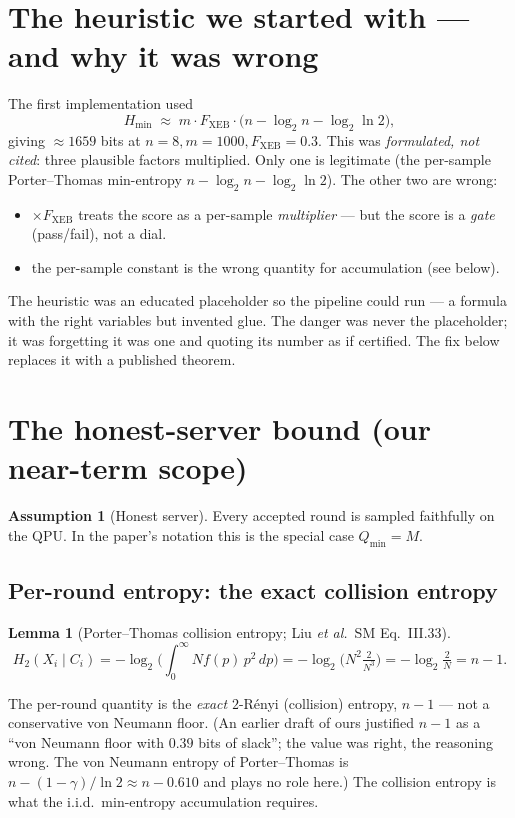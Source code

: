 \documentclass[11pt]{article}
\theoremstyle{definition}
\newtheorem{assumption}{Assumption}
\theoremstyle{plain}
\newtheorem{lemma}{Lemma}
\newcommand{\Fxeb}{F_{\mathrm{XEB}}}
\newcommand{\Hmin}{H_{\min}}
\newcommand{\Qmin}{Q_{\min}}
\begin{document}
\section{The heuristic we started with --- and why it was wrong}
The first implementation used
\[
\Hmin \;\approx\; m\cdot\Fxeb\cdot\big(n-\log_2 n-\log_2\ln 2\big),
\]
giving $\approx1659$ bits at $n=8,m=1000,\Fxeb=0.3$. This was \emph{formulated, not cited}:
three plausible factors multiplied. Only one is legitimate (the per-sample Porter--Thomas
min-entropy $n-\log_2 n-\log_2\ln2$). The other two are wrong:
\begin{itemize}[leftmargin=1.6em,itemsep=1pt]
\item $\times\Fxeb$ treats the score as a per-sample \emph{multiplier} --- but the score is
a \emph{gate} (pass/fail), not a dial.
\item the per-sample constant is the wrong quantity for accumulation (see below).
\end{itemize}

\begin{plain}
The heuristic was an educated placeholder so the pipeline could run --- a formula with the
right variables but invented glue. The danger was never the placeholder; it was forgetting
it was one and quoting its number as if certified. The fix below replaces it with a
published theorem.
\end{plain}

\section{The honest-server bound (our near-term scope)}
\begin{assumption}[Honest server]\label{ass:hs}
Every accepted round is sampled faithfully on the QPU. In the paper's notation this is the
special case $\Qmin=M$.
\end{assumption}

\subsection{Per-round entropy: the exact collision entropy}
\begin{lemma}[Porter--Thomas collision entropy; Liu \emph{et al.}\ SM Eq.~III.33]\label{lem:h2}
\[
H_2(X_i\mid C_i) = -\log_2\!\Big(\int_0^\infty N f(p)\,p^2\,dp\Big)
= -\log_2\!\Big(N^2\tfrac{2}{N^3}\Big) = -\log_2\tfrac{2}{N} = n-1 .
\]
\end{lemma}

\begin{okbox}
The per-round quantity is the \emph{exact} $2$-R\'enyi (collision) entropy, $n-1$ --- not a
conservative von Neumann floor. (An earlier draft of ours justified $n-1$ as a ``von Neumann
floor with $0.39$ bits of slack''; the value was right, the reasoning wrong. The von Neumann
entropy of Porter--Thomas is $n-(1-\gamma)/\ln2\approx n-0.610$ and plays no role here.) The
collision entropy is what the i.i.d.\ min-entropy accumulation requires.
\end{okbox}
\end{document}
